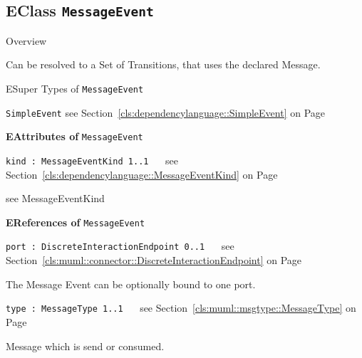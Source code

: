 \subsection{EClass \bfseries \texttt{MessageEvent}\normalfont}
\label{cls:dependencylanguage::MessageEvent} 
	
	\begin{longdescription}
		\item[Overview] 		
				

	

		Can be resolved to a Set of Transitions, that uses the declared Message.		
		\item[ESuper Types of \texttt{MessageEvent}] ~
			\begin{longdescription}
				\item[\texttt{SimpleEvent}] see Section~\ref{cls:dependencylanguage::SimpleEvent} on Page~\pageref{cls:dependencylanguage::SimpleEvent}						\end{longdescription}
		
	
			\item[\textbf{EAttributes of} \texttt{MessageEvent}] ~
			\begin{longdescription}
	\item[\texttt{kind : MessageEventKind \symbol{"5B}1..1\symbol{"5D}
}] ~
	see Section~\ref{cls:dependencylanguage::MessageEventKind} on Page~\pageref{cls:dependencylanguage::MessageEventKind}
	
	\nopagebreak
		
				

	

		 see MessageEventKind		
			\end{longdescription}
			\item[\textbf{EReferences of} \texttt{MessageEvent}] ~
			\begin{longdescription}
	\item[\texttt{port : DiscreteInteractionEndpoint \symbol{"5B}0..1\symbol{"5D}
}] ~
	see Section~\ref{cls:muml::connector::DiscreteInteractionEndpoint} on Page~\pageref{cls:muml::connector::DiscreteInteractionEndpoint}
	
	\nopagebreak
		
				

	

		The Message Event can be optionally bound to one port.		
	\item[\texttt{type : MessageType \symbol{"5B}1..1\symbol{"5D}
}] ~
	see Section~\ref{cls:muml::msgtype::MessageType} on Page~\pageref{cls:muml::msgtype::MessageType}
	
	\nopagebreak
		
				

	

		 Message which is send or consumed.		
			\end{longdescription}
	
	\end{longdescription}
	

